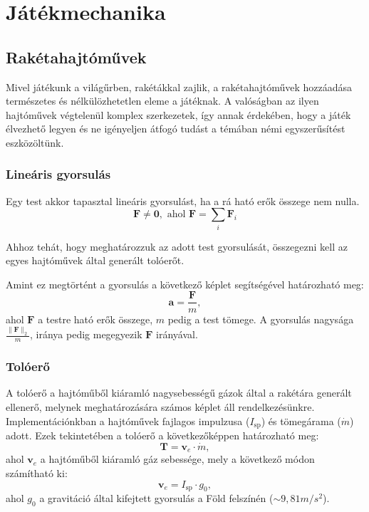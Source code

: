 \documentclass[12pt]{report}
\begin{document}
\fancyfoot{}

\newpage
\section{Játékmechanika}

\subsection{Rakétahajtóművek}

Mivel játékunk a világűrben, rakétákkal zajlik, a rakétahajtóművek hozzáadása természetes és nélkülözhetetlen eleme a játéknak.
A valóságban az ilyen hajtóművek végtelenül komplex szerkezetek, így annak érdekében, hogy a játék élvezhető legyen és ne igényeljen átfogó tudást a témában némi egyszerűsítést eszközöltünk.

\subsubsection{Lineáris gyorsulás}

Egy test akkor tapasztal lineáris gyorsulást, ha a rá ható erők összege nem nulla.
\[
    \mathbf{F} \neq \mathbf{0}, \text{ ahol } \mathbf{F} = \sum_{i} \mathbf{F}_i
\]

Ahhoz tehát, hogy meghatározzuk az adott test gyorsulását, összegezni kell az egyes hajtóművek által generált tolóerőt.

Amint ez megtörtént a gyorsulás a következő képlet segítségével határozható meg:
\[
    \mathbf{a} = \frac{\mathbf{F}}{m},
\]
ahol $\mathbf{F}$ a testre ható erők összege, $m$ pedig a test tömege. A gyorsulás nagysága $\frac{\|\mathbf{F}\|_2}{m}$, iránya pedig megegyezik $\mathbf{F}$ irányával.

\subsubsection{Tolóerő}

A tolóerő a hajtóműből kiáramló nagysebességű gázok által a rakétára generált ellenerő, melynek meghatározására számos képlet áll rendelkezésünkre. Implementációnkban a hajtóművek fajlagos impulzusa ($I_{\text{sp}}$) és tömegárama ($\dot{m}$) adott. Ezek tekintetében a tolóerő a következőképpen határozható meg:
\[
    \mathbf{T} = \mathbf{v}_e \cdot \dot{m},
\]
ahol $\mathbf{v}_e$ a hajtóműből kiáramló gáz sebessége, mely a következő módon számítható ki:
\[
    \mathbf{v}_e = I_{\text{sp}} \cdot g_0,
\]
ahol $g_0$ a gravitáció által kifejtett gyorsulás a Föld felszínén ($\sim9,81 m/s^2$).
\end{document}
